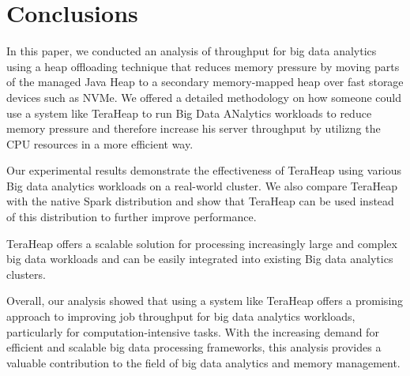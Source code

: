 \section{Conclusions}

In this paper, we conducted an analysis of throughput for big data analytics
using a heap offloading technique that reduces memory pressure by moving parts of
the managed Java Heap to a secondary memory-mapped heap over fast
storage devices such as NVMe. We offered a detailed methodology on
how someone could use a system like TeraHeap to run Big Data ANalytics workloads
to reduce memory pressure and therefore increase his server throughput by utilizng the CPU resources
in a more efficient way.

Our experimental results demonstrate the effectiveness of TeraHeap
using various Big data analytics workloads on a real-world cluster. We also
compare TeraHeap with the native Spark distribution and show
that TeraHeap can be used instead of this distribution to further
improve performance.

TeraHeap offers a scalable solution for processing
increasingly large and complex big data workloads and can be easily
integrated into existing Big data analytics clusters.

Overall, our analysis showed that using a system like TeraHeap offers a promising approach to
improving job throughput for big data analytics workloads, particularly for computation-intensive tasks. With the
increasing demand for efficient and scalable big data processing
frameworks, this analysis provides a valuable contribution to the field
of big data analytics and memory management.
